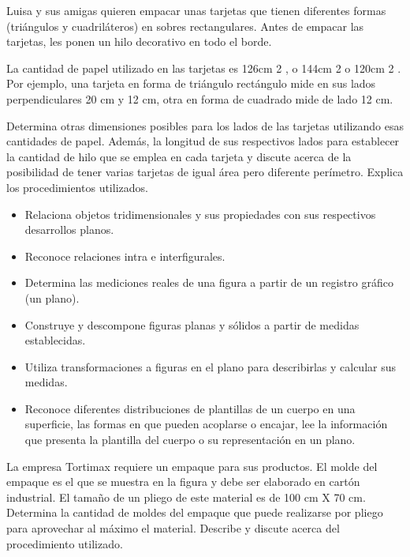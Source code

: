 \ejemplo

Luisa y sus amigas quieren empacar unas tarjetas que tienen diferentes formas (triángulos y cuadriláteros) en sobres rectangulares. Antes de empacar las tarjetas, les ponen un hilo decorativo en todo el borde.

La cantidad de papel utilizado en las tarjetas es 126cm 2 , o 144cm 2 o 120cm 2 . Por ejemplo, una tarjeta en forma de triángulo rectángulo mide en sus lados perpendiculares 20 cm y 12 cm, otra en forma de cuadrado mide de lado 12 cm.

Determina otras dimensiones posibles para los lados de las tarjetas utilizando esas cantidades de papel. Además, la longitud de sus respectivos lados para establecer la cantidad de hilo que se emplea en cada tarjeta y discute acerca de la posibilidad de tener varias tarjetas de igual área pero diferente perímetro. Explica los procedimientos utilizados.



\evidencias

\begin{itemize}
  \item Relaciona objetos tridimensionales y sus propiedades con sus respectivos desarrollos planos.
  \item Reconoce relaciones intra e interfigurales.
  \item Determina las mediciones reales de una figura a partir de un registro gráfico (un plano).
  \item Construye y descompone figuras planas y sólidos a partir de medidas establecidas.
  \item Utiliza transformaciones a figuras en el plano para describirlas y calcular sus medidas.
  \item Reconoce diferentes distribuciones de plantillas de un cuerpo en una superficie, las formas en que pueden acoplarse o encajar, lee la información que presenta la plantilla del cuerpo o su representación en un plano.
\end{itemize}

\ejemplo

La empresa Tortimax requiere un empaque para sus productos. El molde del empaque es el que se muestra en la figura y debe ser elaborado en cartón industrial. El tamaño de un pliego de este material es de 100 cm X 70 cm. Determina la cantidad de moldes del empaque que puede realizarse por pliego para aprovechar al máximo el material. Describe y discute acerca del procedimiento utilizado.


